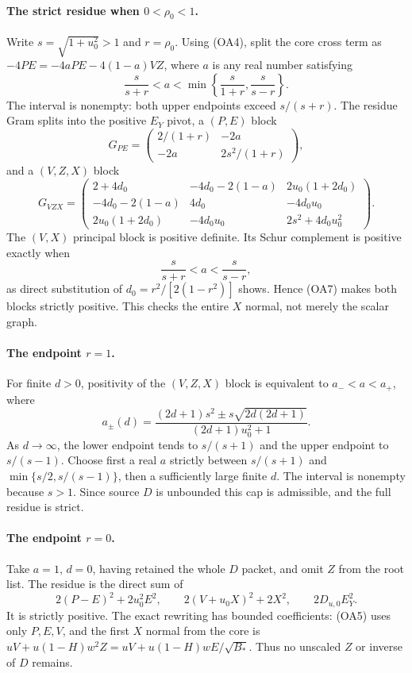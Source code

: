 \paragraph{The strict residue when $0<\rho_0<1$.}
Write $s=\sqrt{1+u_0^2}>1$ and $r=\rho_0$.
Using (OA4), split the core cross term as
$-4PE=-4aPE-4(1-a)VZ$, where $a$ is any real number satisfying
\[
 \frac{s}{s+r}<a<\min\left\{\frac{s}{1+r},\frac{s}{s-r}\right\}.
\tag{OA7}
\]
The interval is nonempty: both upper endpoints exceed $s/(s+r)$.
The residue Gram splits into the positive $E_Y$ pivot, a $(P,E)$ block
\[
 G_{PE}=\begin{pmatrix}2/(1+r)&-2a\\-2a&2s^2/(1+r)\end{pmatrix},
\]
and a $(V,Z,X)$ block
\[
 G_{VZX}=\begin{pmatrix}
 2+4d_0&-4d_0-2(1-a)&2u_0(1+2d_0)\\
 -4d_0-2(1-a)&4d_0&-4d_0u_0\\
 2u_0(1+2d_0)&-4d_0u_0&2s^2+4d_0u_0^2
 \end{pmatrix}.
\tag{OA8}
\]
The $(V,X)$ principal block is positive definite.  Its Schur complement
is positive exactly when
\[
 \frac{s}{s+r}<a<\frac{s}{s-r},
\]
as direct substitution of $d_0=r^2/[2(1-r^2)]$ shows.  Hence (OA7)
makes both blocks strictly positive.  This checks the entire $X$ normal,
not merely the scalar graph.

\paragraph{The endpoint $r=1$.}
For finite $d>0$, positivity of the $(V,Z,X)$ block is equivalent to
$a_-<a<a_+$, where
\[
 a_\pm(d)=
 \frac{(2d+1)s^2\pm s\sqrt{2d(2d+1)}}{(2d+1)u_0^2+1}.
\]
As $d\to\infty$, the lower endpoint tends to $s/(s+1)$ and the upper
endpoint to $s/(s-1)$.  Choose first a real $a$ strictly between
$s/(s+1)$ and $\min\{s/2,s/(s-1)\}$, then a sufficiently large finite
$d$.  The interval is nonempty because $s>1$.  Since source $D$ is
unbounded this cap is admissible, and the full residue is strict.

\paragraph{The endpoint $r=0$.}
Take $a=1$, $d=0$, having retained the whole $D$ packet, and omit
$Z$ from the root list. The residue is the direct sum of
\[
 2(P-E)^2+2u_0^2E^2,
 \qquad 2(V+u_0X)^2+2X^2,
 \qquad 2D_{u,0}E_Y^2.
\tag{OA9}
\]
It is strictly positive. The exact rewriting has bounded coefficients:
(OA5) uses only $P,E,V$, and the first $X$ normal from the core is
$uV+u(1-H)w^2Z=uV+u(1-H)wE/\sqrt{B_*}$.
Thus no unscaled $Z$ or inverse of $D$ remains.

